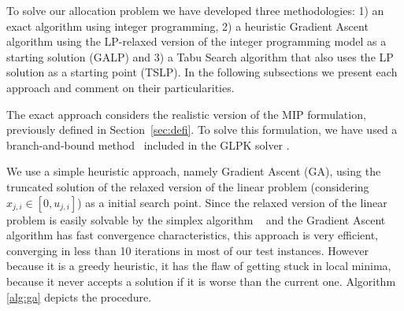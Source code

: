 To solve our allocation problem we have developed three methodologies: 1) an exact algorithm
using integer programming, 2) a heuristic Gradient Ascent algorithm using the LP-relaxed version of the integer
programming model as a starting solution (GALP) and 3) a Tabu Search
algorithm that also uses the LP solution as a starting point (TSLP). In the following subsections we present each approach and comment on their particularities.

%
%
%

The exact approach considers the realistic version of the 
MIP formulation, previously defined in Section~\ref{sec:defi}.
To solve this formulation, we have used a branch-and-bound method~\cite{lawler1966branch}
included in the GLPK solver \cite{GLPK}.

We use a simple heuristic approach, namely Gradient Ascent (GA), using
the truncated solution of the relaxed version of the linear problem (considering $x_{j,i} \in [0,u_{j,i}]$) as a initial search point.
Since the relaxed version of the linear problem is easily solvable by the simplex 
algorithm ~\cite{dantzig1955generalized} and the Gradient Ascent algorithm has 
fast convergence characteristics, this approach is very efficient, 
converging in less than 10 iterations in most of our test instances. 
However because it is a greedy heuristic, it has the flaw of getting stuck in local minima,
because it never accepts a solution if it is worse than the current one.
Algorithm \ref{alg:ga} depicts the procedure.

